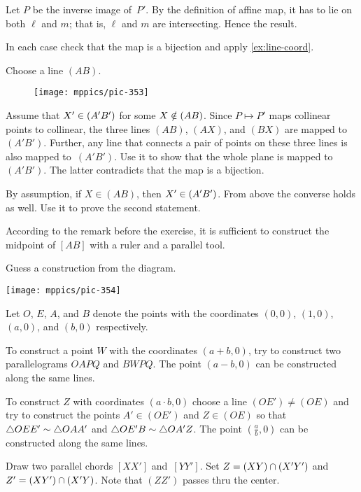\begin{multicols}{2}
Let $P$ be the inverse image of~$P'$.
By the definition of affine map, it has to lie on both $\ell$ and $m$;
that is, $\ell$ and $m$ are intersecting.
Hence the result.

In each case check that the map is a bijection and apply \ref{ex:line-coord}.

Choose a line $(AB)$.

{

\begin{wrapfigure}{o}{20mm}
\vskip-2mm
\centering
\texttt{[image: mppics/pic-353]}
\end{wrapfigure}

Assume that $X'\z\in (A'B')$ for some $X\z\notin(AB)$.
Since $P\mapsto P'$ maps collinear points to collinear, 
the three lines $(AB)$, $(AX)$, and $(BX)$ are mapped to~$(A'B')$.
Further, any line that connects a pair of points on these three lines is also mapped to~$(A'B')$.
Use it to show that the whole plane is mapped to $(A'B')$.
The latter contradicts that the map is a bijection.

}

By assumption, if $X\in (AB)$, then $X'\z\in (A'B')$.
From above the converse holds as well.
Use it to prove the second statement.

According to the remark before the exercise,
it is sufficient to construct the midpoint of $[AB]$
with a ruler and a parallel tool.

Guess a construction from the diagram.

\begin{Figure}
\vskip-0mm
\centering
\texttt{[image: mppics/pic-354]}
\end{Figure}

Let $O$, $E$, $A$, and $B$ denote the points with the coordinates $(0,0)$, $(1,0)$, $(a,0)$, and $(b,0)$ respectively.

To construct a point $W$ with the coordinates $(a+b,0)$, try to construct two parallelograms $OAPQ$ and $BWPQ$.
The point $(a-b,0)$ can be constructed along the same lines.

To construct $Z$ with coordinates $(a\cdot b,0)$
choose a line $(OE')\ne (OE)$
and try to construct the points $A'\in (OE')$
and $Z \in(OE)$
so that 
$\triangle OEE'\z\sim \triangle OAA'$ and $\triangle OE'B\z\sim \triangle OA'Z$.
The point $(\tfrac ab,0)$ can be constructed along the same lines.

Draw two parallel chords $[XX']$ and~$[YY']$.
Set $Z\z=(XY)\z\cap (X'Y')$ and $Z'\z= (XY')\cap (X'Y)$.
Note that $(ZZ')$ passes thru the center.


\end{multicols}

